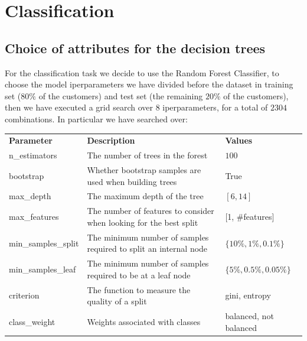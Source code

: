 \chapter{Classification}

\section{Choice of attributes for the decision trees}

For the classification task we decide to use the Random Forest Classifier, to choose the model iperparameters we have divided before the dataset in training set ($80\%$ of the customers) and test set (the remaining $20\%$ of the customers), then we have executed a grid search over $8$ iperparameters, for a total of $2304$ combinations. In particular we have searched over:

\begin{table}[h]
\centering
\begin{adjustbox}{width=1\textwidth}
\small
\begin{tabular}{lll}
\textbf{Parameter}       & \textbf{Description}    & \textbf{Values} \\ \rowcolor[HTML]{EFEFEF} 
n\_estimators            & The number of trees in the forest                                  & $100$                                          \\
bootstrap                & Whether bootstrap samples are used when building trees             & True                                         \\ \rowcolor[HTML]{EFEFEF} 
max\_depth               & The maximum depth of the tree                                      & $[6, 14]$                                         \\           
max\_features            & The number of features to consider when looking for the best split & [1, \#features]        \\ \rowcolor[HTML]{EFEFEF}
min\_samples\_split      & The minimum number of samples required to split an internal node   & $\{10\%, 1\%, 0.1\%\}$                                         \\ 
min\_samples\_leaf       & The minimum number of samples required to be at a leaf node        & $\{5\%, 0.5\%, 0.05\%\}$                   \\ \rowcolor[HTML]{EFEFEF}
criterion                & The function to measure the quality of a split                     & gini, entropy                                        \\ 
class\_weight            & Weights associated with classes                                    & balanced, not balanced                           

\end{tabular}
\end{adjustbox}
\end{table}

